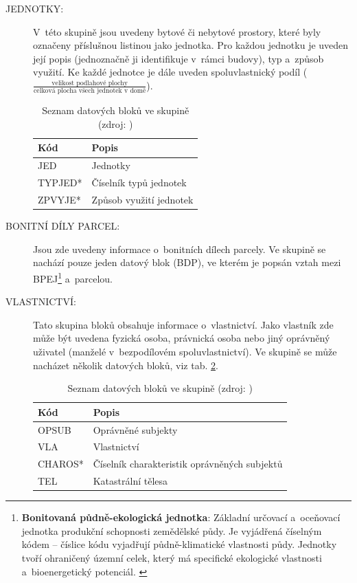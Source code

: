 \documentclass[a4paper,12pt,oneside]{book}
\begin{document}
\begin{description}
\item[JEDNOTKY:] V~této skupině jsou uvedeny bytové či nebytové
  prostory, které byly označeny příslušnou listinou jako jednotka. Pro
  každou jednotku je uveden její popis (jednoznačně ji identifikuje
  v~rámci budovy), typ a~způsob využití. Ke každé jednotce je dále
  uveden spoluvlastnický podíl
  ($\frac{\text{velikost podlahové plochy}}{\text{celková plocha všech
      jednotek v~domě}}$). \cite{dp_landa}
 
 
\begin{table}[htbp]
\centering
\caption[Seznam datových bloků ve skupině ]{Seznam datových bloků ve skupině  (zdroj: \cite{vfk_struktura})}
\begin{tabular}{ll}
\toprule
\textbf{Kód} & \textbf{Popis} \\ 
\midrule
JED & Jednotky \\ 
TYPJED* & Číselník typů jednotek \\ 
ZPVYJE* & Způsob využití jednotek \\ 
\bottomrule
\end{tabular}
\label{t_skupina_jednotky}
\end{table}

\item[BONITNÍ DÍLY PARCEL:] Jsou zde uvedeny informace o~bonitních
  dílech parcely. Ve skupině se nachází pouze jeden datový blok (BDP),
  ve kterém je popsán vztah mezi BPEJ\footnote{\textbf{Bonitovaná
      půdně-ekologická jednotka}: Základní určovací a~oceňovací
    jednotka produkční schopnosti zemědělské půdy. Je vyjádřená
    číselným kódem -- číslice kódu vyjadřují půdně-klimatické
    vlastnosti půdy. Jednotky tvoří ohraničený územní celek, který má
    specifické ekologické vlastnosti a~bioenergetický
    potenciál. \cite{vugtk}} a~parcelou. \cite{dp_landa}
 
\item[VLASTNICTVÍ:] Tato skupina bloků obsahuje informace
  o~vlastnictví. Jako vlastník zde může být uvedena fyzická osoba,
  právnická osoba nebo jiný oprávněný uživatel (manželé v~bezpodílovém
  spoluvlastnictví). Ve skupině se může nacházet několik datových
  bloků, viz tab. \ref{t_skupina_vlastnictvi}. \cite{dp_landa}
 
\begin{table}[htbp]
\centering
\caption[Seznam datových bloků ve skupině ]{Seznam datových bloků ve skupině  (zdroj: \cite{vfk_struktura})}
\begin{tabular}{ll}
\toprule
\textbf{Kód} & \textbf{Popis} \\ 
\midrule
OPSUB & Oprávněné subjekty \\ 
VLA & Vlastnictví \\ 
CHAROS* & Číselník charakteristik oprávněných subjektů \\ 
TEL & Katastrální tělesa \\
\bottomrule
\end{tabular}
\label{t_skupina_vlastnictvi}
\end{table}


\end{description}
\end{document}
